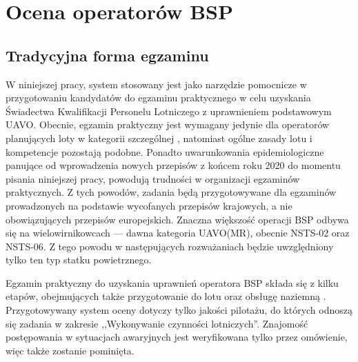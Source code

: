 \newpage
\section{Ocena operatorów BSP}

\subsection{Tradycyjna forma egzaminu}
\label{sec:tradycyjny-egzamin}
W niniejszej pracy, system stosowany jest jako narzędzie pomocnicze w przygotowaniu kandydatów do egzaminu praktycznego w celu uzyskania Świadectwa Kwalifikacji Personelu Lotniczego z uprawnieniem podstawowym UAVO. Obecnie, egzamin praktyczny jest wymagany jedynie dla operatorów planujących loty w kategorii szczególnej \cite{ulc2019}, natomiast ogólne zasady lotu i kompetencje pozostają podobne. Ponadto uwarunkowania epidemiologiczne panujące od wprowadzenia nowych przepisów z końcem roku 2020 do momentu pisania niniejszej pracy, powodują trudności w organizacji egzaminów praktycznych. Z tych powodów, zadania będą przygotowywane dla egzaminów prowadzonych na podstawie wycofanych przepisów krajowych, a nie obowiązujących przepisów europejskich. Znaczna większość operacji BSP odbywa się na wielowirnikowcach --- dawna kategoria UAVO(MR), obecnie NSTS-02 oraz NSTS-06. Z tego powodu w następujących rozważaniach będzie uwzględniony tylko ten typ statku powietrznego.

Egzamin praktyczny do uzyskania uprawnień operatora BSP składa się z kilku etapów, obejmujących także przygotowanie do lotu oraz obsługę naziemną \cite{ulc2014}. Przygotowywany system oceny dotyczy tylko jakości pilotażu, do których odnoszą się zadania w zakresie ,,Wykonywanie czynności lotniczych''. Znajomość postępowania w sytuacjach awaryjnych jest weryfikowana tylko przez omówienie, więc także zostanie pominięta.

